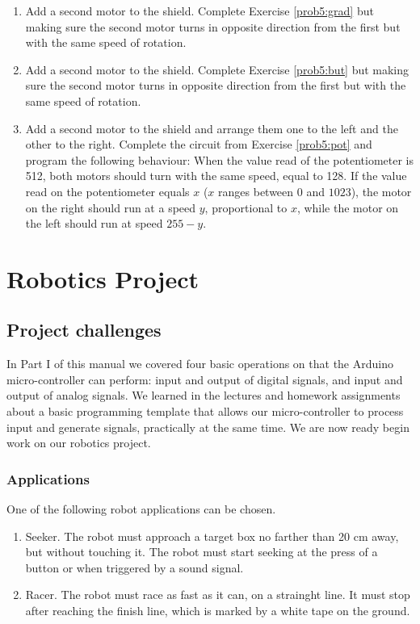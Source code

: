 \documentclass[12pt]{book}
\begin{document}
\begin{enumerate}[1.]
\item\label{ex6:ch5} Add a second motor to the shield. Complete Exercise
  \ref*{prob5:grad} but making sure the second motor turns in opposite
  direction from the first but with the same speed of rotation.

\item Add a second motor to the shield. Complete Exercise
  \ref*{prob5:but} but making sure the second motor turns in opposite
  direction from the first but with the same speed of rotation.

\item Add a second motor to the shield and arrange them one to the
  left and the other to the right. Complete the circuit from Exercise
  \ref*{prob5:pot} and program the following behaviour: When the value
  read of the potentiometer is 512, both motors should turn with the
  same speed, equal to 128. If the value read on the potentiometer
  equals $x$ ($x$ ranges between $0$ and $1023$), the motor on the
  right should run at a speed $y$, proportional to $x$, while the
  motor on the left should run at speed $255-y$.

\end{enumerate}



\part{Robotics Project}

\chapter{Project challenges}\label{challenge:chap}

In Part I of this manual we covered four basic operations on that the
Arduino micro-controller can perform: input and output of digital
signals, and input and output of analog signals. We learned in the
lectures and homework assignments about a basic programming template
that allows our micro-controller to process input and generate
signals, practically at the same time. We are now ready begin work
on our robotics project.

\section{Applications}

One of the following robot applications can be chosen. 
\begin{enumerate}[{A}1:]
\item Seeker. The robot must approach a
target box no farther than 20 cm away, but without touching
it. The robot must start seeking at the press of a button or when triggered by a sound signal.
\item Racer. The robot must race as fast as it can, on a strainght line. It must stop after reaching the finish line, which is marked by a white tape on the ground.  
\end{enumerate}
\end{document}
